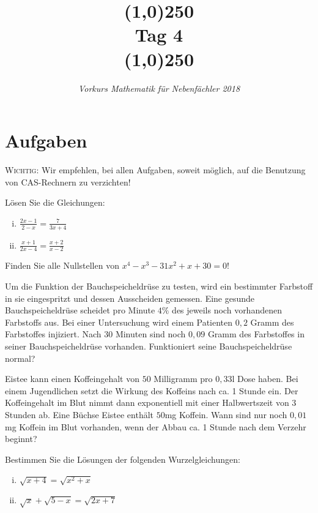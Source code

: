 \documentclass[11pt]{article}
\begin{document}
\title{\line(1,0){250}\\Tag 4\\\line(1,0){250}}
\date{}
\author{\itshape Vorkurs Mathematik für Nebenfächler 2018}
\maketitle
\section*{Aufgaben}
\textsc{Wichtig:} Wir empfehlen, bei allen Aufgaben, soweit möglich, auf die Benutzung von CAS-Rechnern zu verzichten!
\begin{task}
	Lösen Sie die Gleichungen:
	\begin{enumerate}[i)]
		\item $\frac{2x-1}{2-x} = \frac{7}{3x+4}$
		\item $\frac{x+1}{2x-4} = \frac{x+2}{x-2}$
	\end{enumerate}
\end{task}
\begin{task}
	Finden Sie alle Nullstellen von $x^4-x^3-31x^2+x+30=0$!
\end{task}
\dotfill
\begin{task}
	Um die Funktion der Bauchspeicheldr\"use zu testen, wird ein bestimmter Farbstoff in sie eingespritzt und dessen Ausscheiden gemessen. Eine gesunde Bauchspeicheldr\"use
	scheidet pro Minute $4 \%$ des jeweils noch vorhandenen Farbstoffs aus. Bei einer Untersuchung wird einem Patienten $0,2$ Gramm des Farbstoffes injiziert. Nach
	$30$ Minuten sind noch $0,09$ Gramm des Farbstoffes in seiner Bauchspeicheldr\"use vorhanden. Funktioniert seine Bauchspeicheldr\"use normal?
\end{task}
\begin{task}
	Eistee kann einen Koffeingehalt von $50$ Milligramm pro $0,33$l Dose haben. Bei einem Jugendlichen setzt die Wirkung des Koffeins nach ca. 1 Stunde ein. Der Koffeingehalt im Blut nimmt dann exponentiell
	mit einer Halbwertszeit von $3$ Stunden ab. Eine B\"uchse Eistee enth\"alt $50$mg Koffein. Wann sind nur noch $0,01$mg Koffein im Blut vorhanden, wenn der Abbau ca. 1 Stunde nach dem Verzehr beginnt?
\end{task}
\dotfill
\begin{task}
Bestimmen Sie die L\"osungen der folgenden Wurzelgleichungen: 
\begin{enumerate}[i)]
	\item $\sqrt{x+4}=\sqrt{x^2+x}$
	\item $\sqrt{x}+\sqrt{5-x}=\sqrt{2x+7}$
\end{enumerate}  
\end{task}
\end{document}
